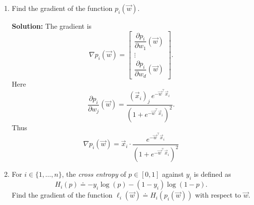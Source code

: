 \documentclass[10pt]{article}
\begin{document}
\begin{enumerate}[label=(\alph*)]
\item Find the gradient of the function $p_i(\vec{w})$.

\textbf{Solution:} The gradient is
\begin{equation}
\nabla p_i(\vec{w}) = \begin{bmatrix} \dfrac{\partial p_i}{\partial w_1}(\vec{w}) \\[6pt] \vdots \\[6pt] \dfrac{\partial p_i}{\partial w_d}(\vec{w}) \end{bmatrix}.
\end{equation}
Here
\begin{equation}
\frac{\partial p_i}{\partial w_j}(\vec{w}) = \frac{(\vec{x}_i)_j \, e^{-\vec{w}^\top \vec{x}_i}}{\left(1 + e^{-\vec{w}^\top \vec{x}_i}\right)^2}.
\end{equation}
Thus
\begin{equation}
\nabla p_i(\vec{w}) = \vec{x}_i \cdot \frac{e^{-\vec{w}^\top \vec{x}_i}}{\left(1 + e^{-\vec{w}^\top \vec{x}_i}\right)^2}
\end{equation}

\item For $i \in \{1, \ldots, n\}$, the \emph{cross entropy} of $p \in [0,1]$ against $y_i$ is defined as
\begin{equation}
H_i(p) \doteq -y_i \log(p) - (1 - y_i) \log(1 - p).
\end{equation}
Find the gradient of the function $\ell_i(\vec{w}) \doteq H_i(p_i(\vec{w}))$ with respect to $\vec{w}$.


\end{enumerate}
\end{document}
